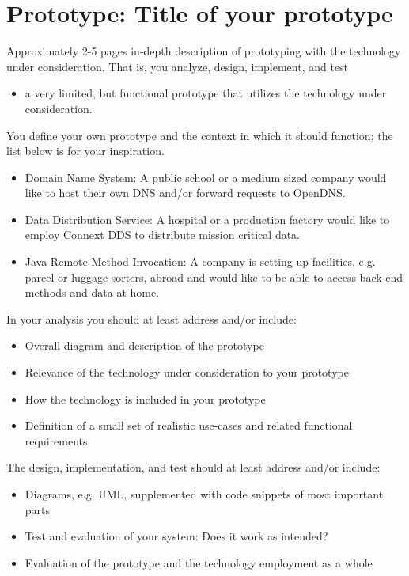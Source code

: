 \documentclass[Main]{subfiles}
\begin{document}
\chapter{Prototype: Title of your prototype}

Approximately 2-5 pages in-depth description of prototyping with the
technology under consideration. That is, you analyze, design,
implement, and test
\begin{itemize}
\item a very limited, but functional prototype that utilizes the
  technology under consideration.
\end{itemize}

You define your own prototype and the context in which it should
function; the list below is for your inspiration.

\begin{itemize}
\item Domain Name System: A public school or a medium sized company
  would like to host their own DNS and/or forward requests to OpenDNS.
\item Data Distribution Service: A hospital or a production factory
  would like to employ Connext DDS to distribute mission critical
  data.
\item Java Remote Method Invocation: A company is setting up
  facilities, e.g. parcel or luggage sorters, abroad and would like to
  be able to access back-end methods and data at home.
\end{itemize}

In your analysis you should at least address and/or include:

\begin{itemize}
\item Overall diagram and description of the prototype
\item Relevance of the technology under consideration to your prototype
\item How the technology is included in your prototype
\item Definition of a small set of realistic use-cases and related
  functional requirements
\end{itemize}

The design, implementation, and test should at least address and/or include:

\begin{itemize}
\item Diagrams, e.g. UML, supplemented with code snippets of most important parts
\item Test and evaluation of your system: Does it work as intended?
\item Evaluation of the prototype and the technology employment as a
  whole
\end{itemize}
\end{document}
